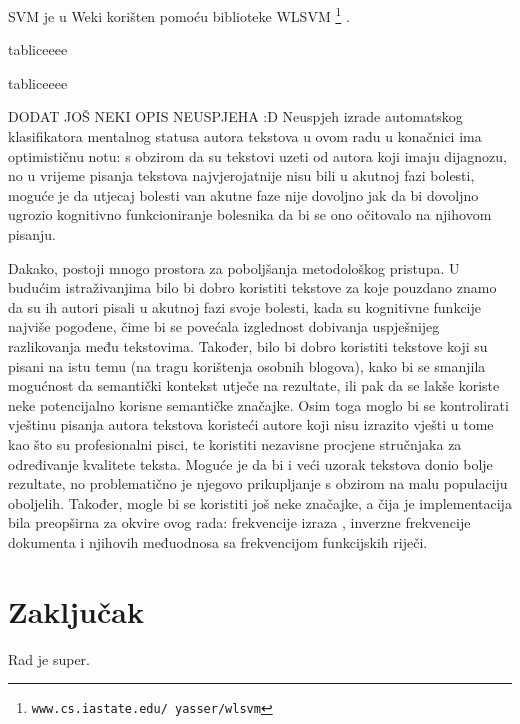 \documentclass[10pt, a4paper]{article}
\begin{document}
SVM je u Weki korišten pomoću biblioteke WLSVM \footnote{\texttt{www.cs.iastate.edu/~yasser/wlsvm}} \citep{yh05}.

tabliceeee

tabliceeee

DODAT JOŠ NEKI OPIS NEUSPJEHA :D
Neuspjeh izrade automatskog klasifikatora mentalnog statusa autora tekstova u ovom radu u konačnici ima optimističnu notu: s obzirom da su tekstovi uzeti od autora koji imaju dijagnozu, no u vrijeme pisanja tekstova najvjerojatnije nisu bili u akutnoj fazi bolesti, moguće je da utjecaj bolesti van akutne faze nije dovoljno jak da bi dovoljno ugrozio kognitivno funkcioniranje bolesnika da bi se ono očitovalo na njihovom pisanju. 

Dakako, postoji mnogo prostora za poboljšanja metodološkog pristupa. U budućim istraživanjima bilo bi dobro koristiti tekstove za koje pouzdano znamo da su ih autori pisali u akutnoj fazi svoje bolesti, kada su kognitivne funkcije najviše pogođene, čime bi se povećala izglednost dobivanja uspješnijeg razlikovanja među tekstovima. Također, bilo bi dobro koristiti tekstove koji su pisani na istu temu (na tragu korištenja osobnih blogova), kako bi se smanjila mogućnost da semantički kontekst utječe na rezultate, ili pak da se lakše koriste neke potencijalno korisne semantičke značajke. Osim toga moglo bi se kontrolirati vještinu pisanja autora tekstova koristeći autore koji nisu izrazito vješti u tome kao što su profesionalni pisci, te koristiti nezavisne procjene stručnjaka za određivanje kvalitete teksta. Moguće je da bi i veći uzorak tekstova donio bolje rezultate, no problematično je njegovo prikupljanje s obzirom na malu populaciju oboljelih. Također, mogle bi se koristiti još neke značajke, a čija je implementacija bila preopširna za okvire ovog rada: frekvencije izraza , inverzne frekvencije dokumenta  i njihovih međuodnosa sa frekvencijom funkcijskih riječi.


\section{Zaključak}

Rad je super.



 
\end{document}
